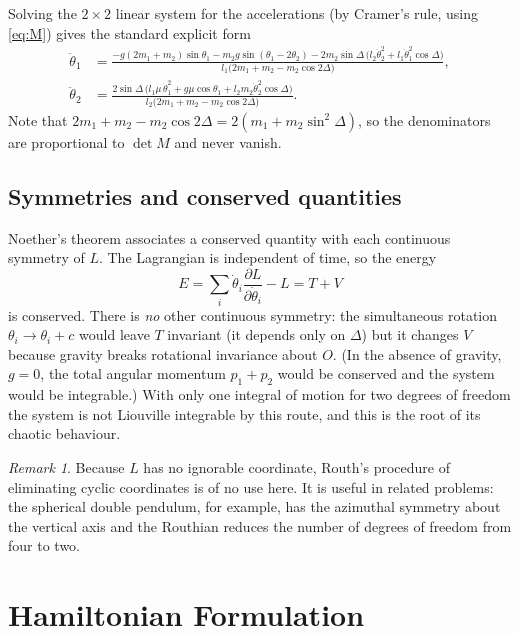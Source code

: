 \documentclass[11pt,a4paper]{book}
\theoremstyle{definition}
\theoremstyle{remark}
\newtheorem*{remark}{Remark}
\begin{document}
Solving the $2\times2$ linear system for the accelerations (by Cramer's rule, using \eqref{eq:M}) gives the
standard explicit form
\begin{align}
  \ddot\theta_1&=\frac{-g(2m_1+m_2)\sin\theta_1-m_2g\sin(\theta_1-2\theta_2)-2m_2\sin\Delta\,\big(l_2\dot\theta_2^2+l_1\dot\theta_1^2\cos\Delta\big)}
  {l_1\big(2m_1+m_2-m_2\cos2\Delta\big)},\label{eq:acc1}\\[4pt]
  \ddot\theta_2&=\frac{2\sin\Delta\,\big(l_1\mu\,\dot\theta_1^2+g\mu\cos\theta_1+l_2m_2\dot\theta_2^2\cos\Delta\big)}
  {l_2\big(2m_1+m_2-m_2\cos2\Delta\big)} .\label{eq:acc2}
\end{align}
Note that $2m_1+m_2-m_2\cos2\Delta=2(m_1+m_2\sin^2\Delta)$, so the denominators are proportional to $\det M$
and never vanish.

\subsection{Symmetries and conserved quantities}

Noether's theorem associates a conserved quantity with each continuous symmetry of $L$. The Lagrangian is
independent of time, so the energy
\begin{equation}
  E=\sum_i\dot\theta_i\frac{\partial L}{\partial\dot\theta_i}-L=T+V
\end{equation}
is conserved. There is \emph{no} other continuous symmetry: the simultaneous rotation $\theta_i\to\theta_i+c$ would
leave $T$ invariant (it depends only on $\Delta$) but it changes $V$ because gravity breaks rotational invariance
about $O$. (In the absence of gravity, $g=0$, the total angular momentum $p_1+p_2$ would be conserved and the system
would be integrable.) With only one integral of motion for two degrees of freedom the system is not Liouville
integrable by this route, and this is the root of its chaotic behaviour.

\begin{remark}
Because $L$ has no ignorable coordinate, Routh's procedure of eliminating cyclic coordinates is of no use here. It is
useful in related problems: the spherical double pendulum, for example, has the azimuthal symmetry about the vertical axis
and the Routhian reduces the number of degrees of freedom from four to two.
\end{remark}

\section{Hamiltonian Formulation}
\label{sec:hamilton}
\end{document}
